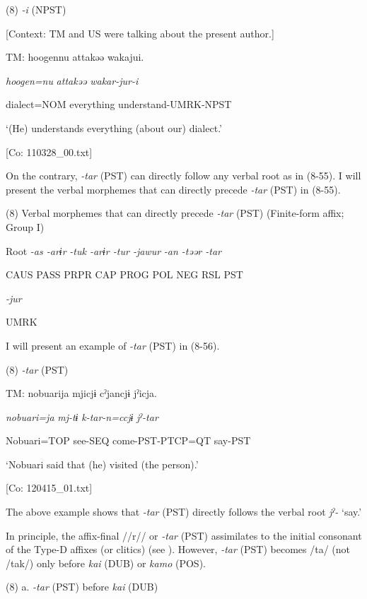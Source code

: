 (8)  \textit{{}-i} (NPST)

  [Context: TM and US were talking about the present author.]

  TM:  {\textbar}hoogen{\textbar}nu  attakəə  wakajui.

    \textit{hoogen=nu}  \textit{attakəə}  \textit{wakar-jur-i}

    dialect=NOM  everything  understand-UMRK-NPST

    ‘(He) understands everything (about our) dialect.’

    [Co: 110328\_00.txt]

  On the contrary, \textit{{}-tar} (PST) can directly follow any verbal root as in (8-55). I will present the verbal morphemes that can directly precede \textit{{}-tar} (PST) in (8-55).

(8)  Verbal morphemes that can directly precede \textit{{}-tar} (PST) (Finite-form affix; Group I)

  Root  \textit{{}-as  {}-arɨr} %
\textit{{}-tuk  {}-arɨr  {}-tur  {}-jawur} %
\textit{{}-an  {}-təər  {}-tar}

    CAUS  PASS  PRPR  CAP  PROG  POL  NEG  RSL  PST

          \textit{{}-jur} 

          UMRK  

I will present an example of \textit{{}-tar} (PST) in (8-56).

(8)  \textit{{}-tar} (PST)

  TM:  nobuarija  mjicjɨ  cˀjancjɨ  jˀicja.

    \textit{nobuari=ja}  \textit{mj-tɨ}  \textit{k-tar-n=ccjɨ}  \textit{jˀ-tar}

    Nobuari=TOP  see-SEQ  come-PST-PTCP=QT  say-PST

    ‘Nobuari said that (he) visited (the person).’

    [Co: 120415\_01.txt]

The above example shows that \textit{{}-tar} (PST) directly follows the verbal root \textit{jˀ-} ‘say.’

In principle, the affix-final //r// or \textit{{}-tar} (PST) assimilates to the initial consonant of the Type-D affixes (or clitics) (see ). However, \textit{{}-tar} (PST) becomes /ta/ (not /tak/) only before \textit{kai} (DUB) or \textit{kamo} (POS).

(8)  a. \textit{{}-tar} (PST) before \textit{kai} (DUB)

